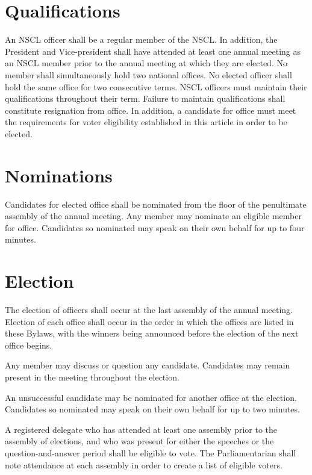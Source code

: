 \documentclass{bylaws}
\newcommand{\NSCL}{\textsc{NSCL}\xspace}
\begin{document}
\begin{linenumbers}[1]
  \section{Qualifications}
  An \NSCL officer shall be a regular member of the \NSCL. In addition,
  the President and Vice-president shall have attended at least one
  annual meeting as an \NSCL member prior to the annual meeting at which
  they are elected.  No member shall simultaneously hold two national
  offices. No elected officer shall hold the same office for two
  consecutive terms. \NSCL officers must maintain their qualifications
  throughout their term. Failure to maintain qualifications shall
  constitute resignation from office. In addition, a candidate for
  office must meet the requirements for voter eligibility established in
  this article in order to be elected.\\

  \section{Nominations} 
  Candidates for elected office shall be nominated from the floor of the
  penultimate assembly of the annual meeting. Any member may nominate an
  eligible member for office. Candidates so nominated may speak on their
  own behalf for up to four minutes.\\

  \section{Election}
  \begin{enumerate}
     The election of officers shall occur at the
    last assembly of the annual meeting. Election of each office shall
    occur in the order in which the offices are listed in these Bylaws,
    with the winners being announced before the election of the next
    office begins.
    
    \sub[Discussion] Any member may discuss or question any
    candidate. Candidates may remain present in the meeting throughout
    the election.
    
     An unsuccessful candidate may be
    nominated for another office at the election. Candidates so
    nominated may speak on their own behalf for up to two minutes.
    
     A registered delegate
    who has attended at least one assembly prior to the assembly of
    elections, and who was present for either the speeches or the
    question-and-answer period shall be eligible to vote. The
    Parliamentarian shall note attendance at each assembly in order to
    create a list of eligible voters.
    

\end{enumerate}
\end{linenumbers}
\end{document}
